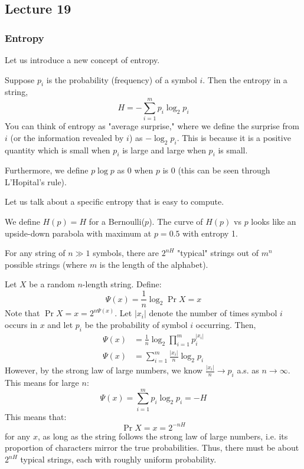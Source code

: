 \subsection{Lecture 19}
\subsubsection{Entropy}
Let us introduce a new concept of entropy.

\begin{definition}
    Suppose $p_i$ is the probability (frequency) of a symbol $i$. Then the entropy in a string,
    \[ H = - \sum_{i = 1}^m p_i \log_2{p_i} \]
    You can think of entropy as "average surprise," where we define the surprise from $i$ (or the information revealed by $i$)
    as $- \log_2{p_i}$. This is because it is a positive quantity which is small when $p_i$ is large and large when $p_i$ is small.

    Furthermore, we define $p \log p$ as 0 when $p$ is 0 (this can be seen through L'Hopital's rule).
\end{definition}

Let us talk about a specific entropy that is easy to compute.
\begin{example}
    We define $H(p) = H$ for a Bernoulli($p$). The curve of $H(p)$ vs $p$
    looks like an upside-down parabola with maximum at $p = 0.5$ with entropy 1.
\end{example}

\begin{theorem}
    For any string of $n \gg 1$ symbols, there are $2^{nH}$ "typical" strings out of $m^n$ possible strings (where $m$ is the length of the alphabet).

    \begin{proof*}
        Let $X$ be a random $n$-length string. Define:
        \[ \Psi(x) = \frac{1}{n} \log_2 {\Pr{X = x}} \]
        Note that $\Pr{X = x} = 2^{n \Psi(x)}$.
        Let $|x_i|$ denote the number of times symbol $i$ occurs in $x$ and let $p_i$ be the probability of symbol $i$ occurring. Then,
        \begin{align*}
            \Psi(x) &= \frac{1}{n} \log_2 {\prod_{i =1}^m p_i^{|x_i|}} \\
            \Psi(x) &= \sum_{i = 1}^m \frac{|x_i|}{n} \log_2{p_i}
        \end{align*}
        However, by the strong law of large numbers, we know $\frac{|x_i|}{n} \to p_i$ a.s. as $n \to \infty$. This means for large $n$:
        \[ \Psi(x) = \sum_{i = 1}^m p_i \log_2{p_i} = - H \]
        This means that:
        \[ \Pr{X = x} = 2^{-nH} \]
        for any $x$, as long as the string follows the strong law of large numbers, i.e. its proportion of characters mirror
        the true probabilities.
        Thus, there must be about $2^{nH}$ typical strings, each with roughly uniform probability.
    \end{proof*}
\end{theorem}

